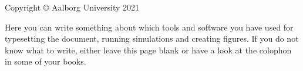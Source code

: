 \thispagestyle{empty}
{\small
\strut\vfill %
\noindent Copyright \copyright{} Aalborg University 2021\par
\vspace{0.2cm}
\noindent Here you can write something about which tools and software you have used for typesetting the document, running simulations and creating figures. If you do not know what to write, either leave this page blank or have a look at the colophon in some of your books.
}
\clearpage

